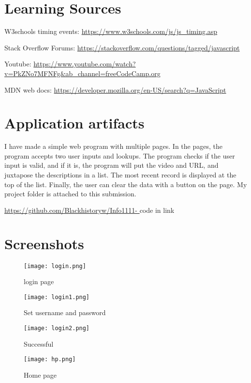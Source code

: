 \documentclass{article}
\begin{document}
\section{Learning Sources}

W3schools timing events: \url{https://www.w3schools.com/js/js_timing.asp}

Stack Overflow Forums: \url{https://stackoverflow.com/questions/tagged/javascript}

Youtube: \url{https://www.youtube.com/watch?v=PkZNo7MFNFg&ab_channel=freeCodeCamp.org}

MDN web docs: \url{https://developer.mozilla.org/en-US/search?q=JavaScript}

\section{Application artifacts}

I have made a simple web program with multiple pages. In the pages, the program accepts two user inputs and lookups. The program checks if the user input is valid, and if it is, the program will put the video and URL, and juxtapose the descriptions in a list. The most recent record is displayed at the top of the list. Finally, the user can clear the data with a button on the page. My project folder is attached to this submission.

\url{https://github.com/Blackhistoryw/Info1111- }
code in link 

\section{Screenshots}

\begin{figure}
\texttt{[image: login.png]}
\caption{\label{fig:frog}login page}
\end{figure}

\begin{figure}
\texttt{[image: login1.png]}
\caption{\label{fig:frog}Set username and password}
\end{figure}

\begin{figure}
\texttt{[image: login2.png]}
\caption{\label{fig:frog}Successful}
\end{figure}

\begin{figure}
\texttt{[image: hp.png]}
\caption{\label{fig:frog}Home page}
\end{figure}
\end{document}
